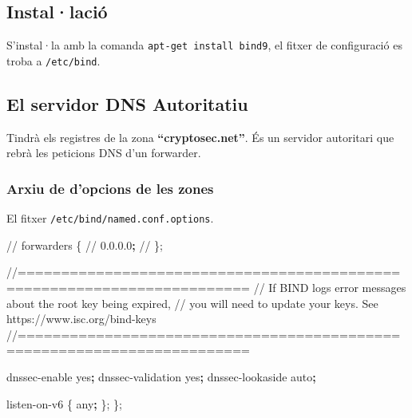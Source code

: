\documentclass[]{article}
\newenvironment{Shaded}{}{}
\newcommand{\ExtensionTok}[1]{#1}
\newcommand{\KeywordTok}[1]{\textcolor[rgb]{0.00,0.44,0.13}{\textbf{#1}}}
\newcommand{\NormalTok}[1]{#1}
\begin{document}
\hypertarget{installaciuxf3}{%
\subsection{\texorpdfstring{\textbf{Instal·lació}}{Instal·lació}}\label{installaciuxf3}}

S'instal·la amb la comanda \texttt{apt-get\ install\ bind9}, el fitxer
de configuració es troba a \texttt{/etc/bind}.

\hypertarget{el-servidor-dns-autoritatiu}{%
\subsection{\texorpdfstring{\textbf{El servidor DNS
Autoritatiu}}{El servidor DNS Autoritatiu}}\label{el-servidor-dns-autoritatiu}}

Tindrà els registres de la zona \textbf{``cryptosec.net''}. És un
servidor autoritari que rebrà les peticions DNS d'un forwarder.

\hypertarget{arxiu-de-dopcions-de-les-zones}{%
\subsubsection{\texorpdfstring{\textbf{Arxiu de d'opcions de les
zones}}{Arxiu de d'opcions de les zones}}\label{arxiu-de-dopcions-de-les-zones}}

El fitxer \texttt{/etc/bind/named.conf.options}.

\begin{Shaded}
\begin{Highlighting}[]
        \ExtensionTok{//}\NormalTok{ forwarders \{}
        \ExtensionTok{//}\NormalTok{      0.0.0.0}\KeywordTok{;}
        \ExtensionTok{//}\NormalTok{ \};}

        \ExtensionTok{/}\NormalTok{/========================================================================}
        \ExtensionTok{//}\NormalTok{ If BIND logs error messages about the root key being expired,}
        \ExtensionTok{//}\NormalTok{ you will need to update your keys.  See https://www.isc.org/bind-keys}
        \ExtensionTok{/}\NormalTok{/========================================================================}

        \ExtensionTok{dnssec-enable}\NormalTok{ yes}\KeywordTok{;}
        \ExtensionTok{dnssec-validation}\NormalTok{ yes}\KeywordTok{;}
        \ExtensionTok{dnssec-lookaside}\NormalTok{ auto}\KeywordTok{;}

        \ExtensionTok{listen-on-v6}\NormalTok{ \{ any}\KeywordTok{;}\NormalTok{ \};}
\NormalTok{\};}
\end{Highlighting}
\end{Shaded}
\end{document}
